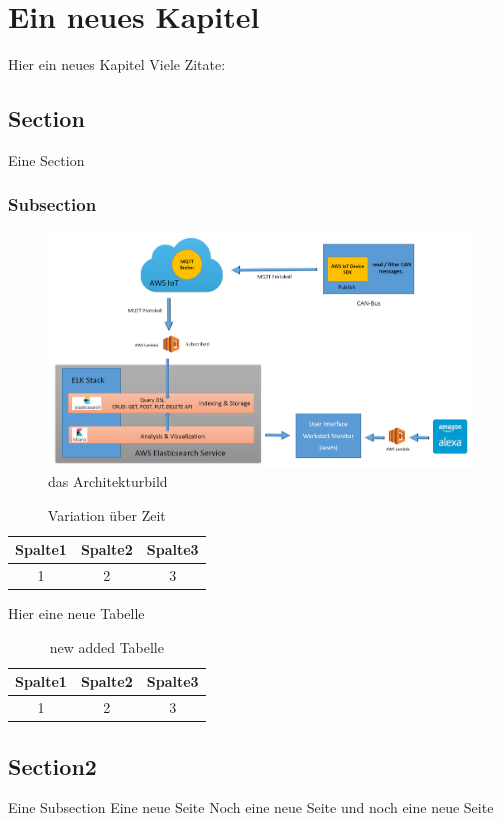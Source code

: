 \chapter{Ein neues Kapitel}
    Hier ein neues Kapitel
    Viele Zitate: \cite{patterson} \cite{krizhevsky} \cite{matlab} \cite{pitts} \cite{lawrence} \cite{miesbach}
    \section{Section}
        Eine Section
        \subsection{Subsection}
            \begin{figure}[h]
                \includegraphics[scale=0.2]{Abbildungen/Kapitel3/Big-architecture.png}
                \centering
                \caption{das Architekturbild}
                \label{Abb:Architekturbild}   
            \end{figure}  
             \begin{table}[h]
                \begin{tabular}{ccc}
                      \hline
                      Spalte1 & Spalte2 & Spalte3\\                      
                      \hline
                      1 & 2 & 3\\
                      \hline
                \end{tabular}
                \centering
                \caption{Variation über Zeit}
                \label{Tab:Tabelle3}
            \end{table}
            
Hier eine neue Tabelle   
            
            \begin{table}[h]
                \begin{tabular}{ccc}
                      \hline
                      Spalte1 & Spalte2 & Spalte3\\                      
                      \hline
                      1 & 2 & 3\\
                      \hline
                \end{tabular}
                \centering
                \caption{new added Tabelle}
                \label{Tab:New added}
            \end{table}
 
        
        
    \section{Section2}
        Eine Subsection
        \newpage
        Eine neue Seite
        \newpage 
        Noch eine neue Seite
        \newpage    
        und noch eine neue Seite